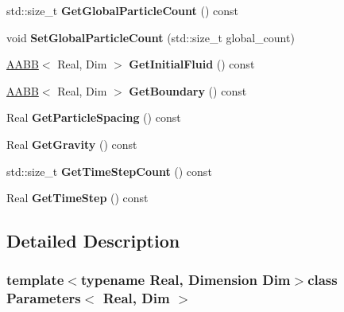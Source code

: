\begin{DoxyCompactItemize}
\item 
\hypertarget{classParameters_ad10dbf2200d38506d4e1c0307dcb1824}{}std\+::size\+\_\+t {\bfseries Get\+Global\+Particle\+Count} () const \label{classParameters_ad10dbf2200d38506d4e1c0307dcb1824}

\item 
\hypertarget{classParameters_a6189dda9a6e821542a85308a76999d84}{}void {\bfseries Set\+Global\+Particle\+Count} (std\+::size\+\_\+t global\+\_\+count)\label{classParameters_a6189dda9a6e821542a85308a76999d84}

\item 
\hypertarget{classParameters_ae06f7eb7ea6522aac9cd12b96968227f}{}\hyperlink{classAABB}{A\+A\+B\+B}$<$ Real, Dim $>$ {\bfseries Get\+Initial\+Fluid} () const \label{classParameters_ae06f7eb7ea6522aac9cd12b96968227f}

\item 
\hypertarget{classParameters_add0d3ed082b185fa0e387deca5168435}{}\hyperlink{classAABB}{A\+A\+B\+B}$<$ Real, Dim $>$ {\bfseries Get\+Boundary} () const \label{classParameters_add0d3ed082b185fa0e387deca5168435}

\item 
\hypertarget{classParameters_a6efe5677f67ce376516c8fa2202ca907}{}Real {\bfseries Get\+Particle\+Spacing} () const \label{classParameters_a6efe5677f67ce376516c8fa2202ca907}

\item 
\hypertarget{classParameters_ad4ff8e726affb483e52f1601019871d4}{}Real {\bfseries Get\+Gravity} () const \label{classParameters_ad4ff8e726affb483e52f1601019871d4}

\item 
\hypertarget{classParameters_a9670f76c42f86ed6eef2e46ef1508364}{}std\+::size\+\_\+t {\bfseries Get\+Time\+Step\+Count} () const \label{classParameters_a9670f76c42f86ed6eef2e46ef1508364}

\item 
\hypertarget{classParameters_a091d93d14f340fe84c8b475f50faf80b}{}Real {\bfseries Get\+Time\+Step} () const \label{classParameters_a091d93d14f340fe84c8b475f50faf80b}

\end{DoxyCompactItemize}


\subsection{Detailed Description}
\subsubsection*{template$<$typename Real, Dimension Dim$>$class Parameters$<$ Real, Dim $>$}

